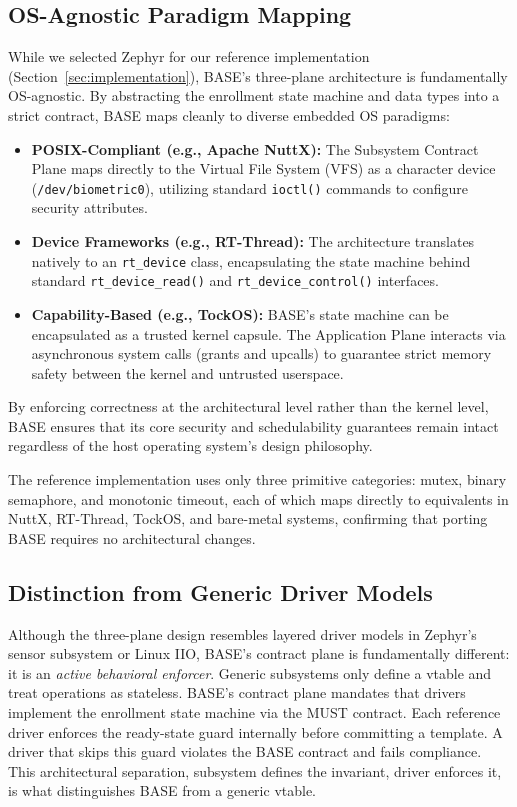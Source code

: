 \subsection{OS-Agnostic Paradigm Mapping}
\label{sec:os_agnostic}
While we selected Zephyr for our reference implementation (Section~\ref{sec:implementation}), BASE's three-plane architecture is fundamentally OS-agnostic. By abstracting the enrollment state machine and data types into a strict contract, BASE maps cleanly to diverse embedded OS paradigms:
\begin{itemize}
    \item \textbf{POSIX-Compliant (e.g., Apache NuttX):} The Subsystem Contract Plane maps directly to the Virtual File System (VFS) as a character device (\texttt{/dev/biometric0}), utilizing standard \texttt{ioctl()} commands to configure security attributes.
    \item \textbf{Device Frameworks (e.g., RT-Thread):} The architecture translates natively to an \texttt{rt\_device} class, encapsulating the state machine behind standard \texttt{rt\_device\_read()} and \texttt{rt\_device\_control()} interfaces.
    \item \textbf{Capability-Based (e.g., TockOS):} BASE's state machine can be encapsulated as a trusted kernel capsule. The Application Plane interacts via asynchronous system calls (grants and upcalls) to guarantee strict memory safety between the kernel and untrusted userspace.
\end{itemize}
By enforcing correctness at the architectural level rather than the kernel level, BASE ensures that its core security and schedulability guarantees remain intact regardless of the host operating system's design philosophy.

The reference implementation uses only three primitive categories: mutex, binary semaphore, and monotonic timeout, each of which maps directly to equivalents in NuttX, RT-Thread, TockOS, and bare-metal systems, confirming that porting BASE requires no architectural changes.

\subsection{Distinction from Generic Driver Models}

Although the three-plane design resembles layered driver models in Zephyr's sensor subsystem or Linux IIO, BASE's contract plane is fundamentally different: it is an \emph{active behavioral enforcer}. Generic subsystems only define a vtable and treat operations as stateless. BASE's contract plane mandates that drivers implement the enrollment state machine via the MUST contract. Each reference driver enforces the ready-state guard internally before committing a template. A driver that skips this guard violates the BASE contract and fails compliance. This architectural separation, subsystem defines the invariant, driver enforces it, is what distinguishes BASE from a generic vtable.